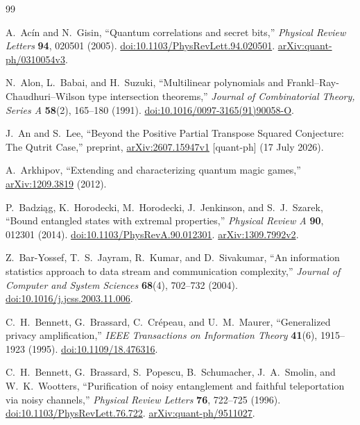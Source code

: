 \begin{thebibliography}{99}
\raggedright
\setlength{\itemsep}{3pt plus 1pt minus 1pt}

A.~Ac\'in and N.~Gisin,
``Quantum correlations and secret bits,''
\emph{Physical Review Letters} \textbf{94}, 020501 (2005).
\href{https://doi.org/10.1103/PhysRevLett.94.020501}{doi:10.1103/PhysRevLett.94.020501}.
\href{https://arxiv.org/abs/quant-ph/0310054v3}{arXiv:quant-ph/0310054v3}.

N.~Alon, L.~Babai, and H.~Suzuki,
``Multilinear polynomials and Frankl--Ray-Chaudhuri--Wilson type intersection theorems,''
\emph{Journal of Combinatorial Theory, Series A} \textbf{58}(2), 165--180 (1991).
\href{https://doi.org/10.1016/0097-3165(91)90058-O}{doi:10.1016/0097-3165(91)90058-O}.

J.~An and S.~Lee,
``Beyond the Positive Partial Transpose Squared Conjecture: The Qutrit Case,''
preprint, \href{https://arxiv.org/abs/2607.15947v1}{arXiv:2607.15947v1}
[quant-ph] (17 July 2026).

A.~Arkhipov,
``Extending and characterizing quantum magic games,''
\href{https://arxiv.org/abs/1209.3819}{arXiv:1209.3819} (2012).

P.~Badzi\k{a}g, K.~Horodecki, M.~Horodecki, J.~Jenkinson,
and S.~J.~Szarek,
``Bound entangled states with extremal properties,''
\emph{Physical Review A} \textbf{90}, 012301 (2014).
\href{https://doi.org/10.1103/PhysRevA.90.012301}{doi:10.1103/PhysRevA.90.012301}.
\href{https://arxiv.org/abs/1309.7992v2}{arXiv:1309.7992v2}.

Z.~Bar-Yossef, T.~S.~Jayram, R.~Kumar, and D.~Sivakumar,
``An information statistics approach to data stream and communication
complexity,''
\emph{Journal of Computer and System Sciences} \textbf{68}(4), 702--732 (2004).
\href{https://doi.org/10.1016/j.jcss.2003.11.006}{doi:10.1016/j.jcss.2003.11.006}.

C.~H.~Bennett, G.~Brassard, C.~Cr\'epeau, and U.~M.~Maurer,
``Generalized privacy amplification,''
\emph{IEEE Transactions on Information Theory} \textbf{41}(6),
1915--1923 (1995).
\href{https://doi.org/10.1109/18.476316}{doi:10.1109/18.476316}.

C.~H.~Bennett, G.~Brassard, S.~Popescu, B.~Schumacher,
J.~A.~Smolin, and W.~K.~Wootters,
``Purification of noisy entanglement and faithful teleportation via noisy channels,''
\emph{Physical Review Letters} \textbf{76}, 722--725 (1996).
\href{https://doi.org/10.1103/PhysRevLett.76.722}{doi:10.1103/PhysRevLett.76.722}.
\href{https://arxiv.org/abs/quant-ph/9511027}{arXiv:quant-ph/9511027}.


\end{thebibliography}
